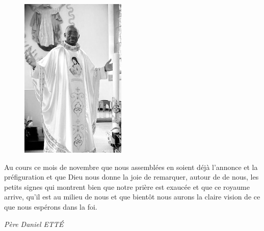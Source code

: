 \begin{figure}
\vspace{-0.4cm}
	\includegraphics[scale=1.20]{../images/standing_daniel}
\end{figure}
Au cours ce mois de novembre que nous assemblées en soient déjà l’annonce et la préfiguration et que Dieu nous donne la joie de remarquer, autour de de nous, les petits signes qui montrent bien que notre prière est exaucée et que ce royaume arrive, qu’il est au milieu de nous et que bientôt nous aurons la claire vision de ce que nous espérons dans la foi.



\begin{flushright}
\textit{Père  Daniel  ETTÉ}
\end{flushright}

